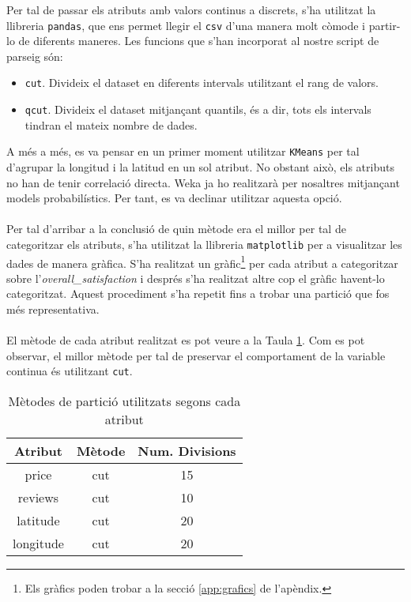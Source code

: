 
\label{sec:partition}

Per tal de passar els atributs amb valors continus a  discrets, s'ha utilitzat la llibreria \texttt{pandas}, que ens permet llegir el \texttt{csv} d'una manera molt còmode i partir-lo de diferents maneres. Les funcions que s'han incorporat al nostre script de parseig són:
\begin{itemize}
	\item \texttt{cut}. Divideix el dataset en diferents intervals utilitzant el rang de valors.
	\item \texttt{qcut}. Divideix el dataset mitjançant quantils, és a dir, tots els intervals tindran el mateix nombre de dades.
\end{itemize}
A més a més, es va pensar en un primer moment utilitzar \texttt{KMeans} per tal d'agrupar la longitud i la latitud en un sol atribut. No obstant això, els atributs no han de tenir correlació directa. Weka ja ho realitzarà per nosaltres mitjançant models probabilístics. Per tant, es va declinar utilitzar aquesta opció.
\\\\
Per tal d'arribar a la conclusió de quin mètode era el millor per tal de categoritzar els atributs, s'ha utilitzat la llibreria \texttt{matplotlib} per a visualitzar les dades de manera gràfica. S'ha realitzat un gràfic\footnote{Els gràfics poden trobar a la secció \ref{app:grafics} de l'apèndix.} per cada atribut a categoritzar sobre l'\textit{overall\_satisfaction} i després s'ha realitzat altre cop el gràfic havent-lo categoritzat. Aquest procediment s'ha repetit fins a trobar una partició que fos més representativa.
\\
\\
El mètode de cada atribut realitzat es pot veure a la Taula \ref{tab:part}. Com es pot observar, el millor mètode per tal de preservar el comportament de la variable continua és utilitzant \texttt{cut}.
\begin{table}[H]
	\centering
\begin{tabular}{ccc}
	Atribut &Mètode & Num. Divisions\\\hline
	price & cut & 15 \\
	reviews & cut & 10 \\
	latitude & cut & 20 \\
	longitude & cut & 20 \\
\end{tabular}
\caption{Mètodes de partició utilitzats segons cada atribut}
\label{tab:part}
\end{table}

